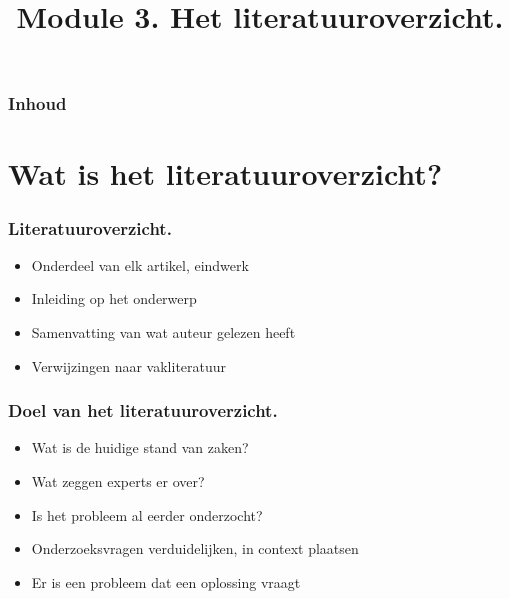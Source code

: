 \documentclass[aspectratio=169]{beamer}
\title{Module 3. Het literatuuroverzicht.}
\subtitle{\coursename}
\author{\lecturers}   %
\date{\academicyear}
\begin{document}
\begin{frame}
  \maketitle
\end{frame}

\begin{frame}
  \frametitle{Inhoud}

  \tableofcontents
\end{frame}


\section{Wat is het literatuuroverzicht?}

\begin{frame}
  \frametitle{Literatuuroverzicht.}

  \begin{itemize}
    \item Onderdeel van elk artikel, eindwerk
    \item Inleiding op het onderwerp
    \item Samenvatting van wat auteur gelezen heeft
    \item Verwijzingen naar vakliteratuur
  \end{itemize}

  \bigskip

\end{frame}

\begin{frame}
  \frametitle{Doel van het literatuuroverzicht.}

  \begin{itemize}
    \item Wat is de huidige stand van zaken?
    \item Wat zeggen experts er over?
    \item Is het probleem al eerder onderzocht?
    \item Onderzoeksvragen verduidelijken, in context plaatsen
    \item Er is een probleem dat een oplossing vraagt
  \end{itemize}

  \bigskip

\end{frame}
\end{document}

